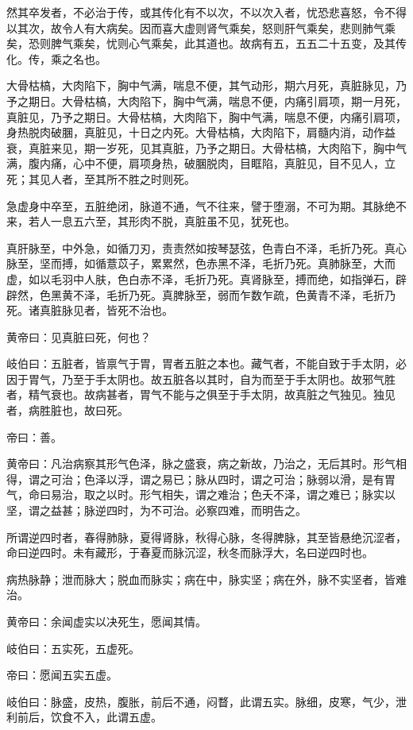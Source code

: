 \documentclass{article}%
\begin{document}
然其卒发者，不必治于传，或其传化有不以次，不以次入者，忧恐悲喜怒，令不得以其次，故令人有大病矣。因而喜大虚则肾气乘矣，怒则肝气乘矣，悲则肺气乘矣，恐则脾气乘矣，忧则心气乘矣，此其道也。故病有五，五五二十五变，及其传化。传，乘之名也。

大骨枯槁，大肉陷下，胸中气满，喘息不便，其气动形，期六月死，真脏脉见，乃予之期日。大骨枯槁，大肉陷下，胸中气满，喘息不便，内痛引肩项，期一月死，真脏见，乃予之期日。大骨枯槁，大肉陷下，胸中气满，喘息不便，内痛引肩项，身热脱肉破䐃，真脏见，十日之内死。大骨枯槁，大肉陷下，肩髓内消，动作益衰，真脏来见，期一岁死，见其真脏，乃予之期日。大骨枯槁，大肉陷下，胸中气满，腹内痛，心中不便，肩项身热，破䐃脱肉，目眶陷，真脏见，目不见人，立死；其见人者，至其所不胜之时则死。

急虚身中卒至，五脏绝闭，脉道不通，气不往来，譬于堕溺，不可为期。其脉绝不来，若人一息五六至，其形肉不脱，真脏虽不见，犹死也。

真肝脉至，中外急，如循刀刃，责责然如按琴瑟弦，色青白不泽，毛折乃死。真心脉至，坚而搏，如循薏苡子，累累然，色赤黑不泽，毛折乃死。真肺脉至，大而虚，如以毛羽中人肤，色白赤不泽，毛折乃死。真肾脉至，搏而绝，如指弹石，辟辟然，色黑黄不泽，毛折乃死。真脾脉至，弱而乍数乍疏，色黄青不泽，毛折乃死。诸真脏脉见者，皆死不治也。

黄帝曰：见真脏曰死，何也？

岐伯曰：五脏者，皆禀气于胃，胃者五脏之本也。藏气者，不能自致于手太阴，必因于胃气，乃至于手太阴也。故五脏各以其时，自为而至于手太阴也。故邪气胜者，精气衰也。故病甚者，胃气不能与之俱至于手太阴，故真脏之气独见。独见者，病胜脏也，故曰死。

帝曰：善。

黄帝曰：凡治病察其形气色泽，脉之盛衰，病之新故，乃治之，无后其时。形气相得，谓之可治；色泽以浮，谓之易已；脉从四时，谓之可治；脉弱以滑，是有胃气，命曰易治，取之以时。形气相失，谓之难治；色夭不泽，谓之难已；脉实以坚，谓之益甚；脉逆四时，为不可治。必察四难，而明告之。

所谓逆四时者，春得肺脉，夏得肾脉，秋得心脉，冬得脾脉，其至皆悬绝沉涩者，命曰逆四时。未有藏形，于春夏而脉沉涩，秋冬而脉浮大，名曰逆四时也。

病热脉静；泄而脉大；脱血而脉实；病在中，脉实坚；病在外，脉不实坚者，皆难治。

黄帝曰：余闻虚实以决死生，愿闻其情。

岐伯曰：五实死，五虚死。

帝曰：愿闻五实五虚。

岐伯曰：脉盛，皮热，腹胀，前后不通，闷瞀，此谓五实。脉细，皮寒，气少，泄利前后，饮食不入，此谓五虚。
\end{document}
